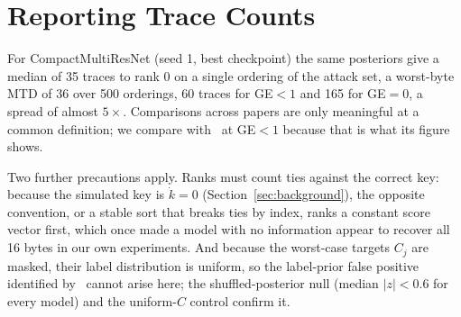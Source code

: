 \section{Reporting Trace Counts}
\label{sec:pitfalls}

For CompactMultiResNet (seed 1, best checkpoint) the same posteriors give a median of 35 traces to
rank 0 on a single ordering of the attack set, a worst-byte MTD of 36 over 500 orderings, 60 traces
for GE$<1$ and 165 for GE$=0$, a spread of almost $5\times$. Comparisons across papers are only meaningful at a common definition;
we compare with~\cite{MS23} at GE$<1$ because that is what its figure shows. 

Two further precautions apply. Ranks must count ties against the correct key: because the simulated key is $\dot k=0$
(Section~\ref{sec:background}), the opposite convention, or a stable sort that breaks ties by index, ranks
a constant score vector first, which once made a model with no information appear
to recover all 16 bytes in our own experiments. And because the worst-case targets $C_j$ are masked,
their label distribution is uniform, so the label-prior false positive identified
by~\cite{ReallyBroken} cannot arise here; the shuffled-posterior null (median $|z|<0.6$ for every
model) and the uniform-$C$ control confirm it.
